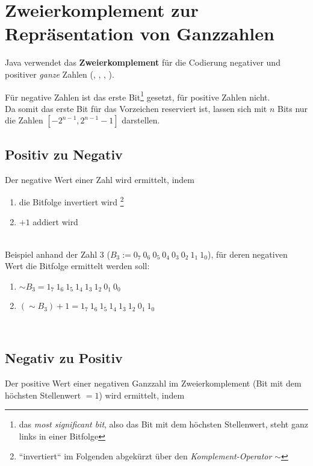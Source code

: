 \section{Zweierkomplement zur Repräsentation von Ganzzahlen}


Java verwendet das \textbf{Zweierkomplement} für die Codierung negativer und positiver \textit{ganze} Zahlen (, , , ).

\noindent
Für negative Zahlen ist das erste Bit\footnote{
    das \textit{most significant bit}, also das Bit mit dem höchsten Stellenwert, steht ganz links in einer Bitfolge
} gesetzt, für positive Zahlen nicht.\\
Da somit das erste Bit für das Vorzeichen reserviert ist, lassen sich mit $n$ Bits nur die Zahlen $[-2^{n-1}, 2^{n-1} -1]$ darstellen.\\


\subsection*{Positiv zu Negativ}
Der negative Wert einer Zahl wird ermittelt, indem

\begin{enumerate}
    \item die Bitfolge invertiert wird \footnote{``invertiert`` im Folgenden abgekürzt über den \textit{Komplement-Operator} $\sim$}
    \item $+1$ addiert wird
\end{enumerate}\\

\noindent
Beispiel anhand der Zahl $3$ ($B_{3}:= 0_7\ 0_6\ 0_5\ 0_4\ 0_3\ 0_2\ 1_1\ 1_0$), für deren negativen Wert die Bitfolge ermittelt werden soll:

\begin{enumerate}
    \item $\sim B_{3} = 1_7\ 1_6\ 1_5\ 1_4\ 1_3\ 1_2\ 0_1\ 0_0$
    \item $(\sim B_{3}) + 1 = 1_7\ 1_6\ 1_5\ 1_4\ 1_3\ 1_2\ 0_1\ 1_0$
\end{enumerate}\\


\subsection*{Negativ zu Positiv}
Der positive Wert einer negativen Ganzzahl im Zweierkomplement (Bit mit dem höchsten Stellenwert $=1$) wird ermittelt, indem

